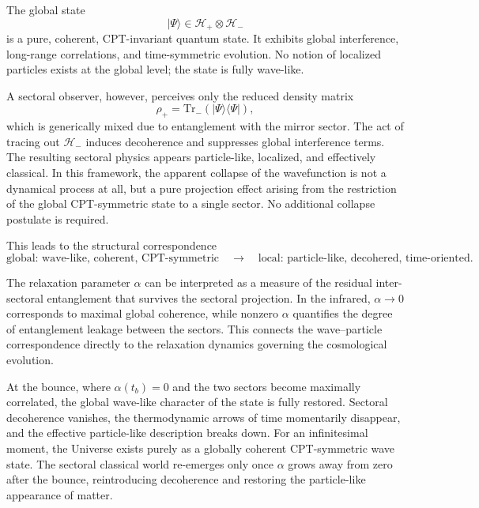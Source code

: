 \documentclass[11pt,a4paper]{article}
\begin{document}
The global state
\begin{equation}
    |\Psi\rangle \in \mathcal{H}_+ \otimes \mathcal{H}_-
\end{equation}
is a pure, coherent, CPT-invariant quantum state. It exhibits global interference, long-range
correlations, and time-symmetric evolution. No notion of localized particles exists at the global
level; the state is fully wave-like.

A sectoral observer, however, perceives only the reduced density matrix
\begin{equation}
    \rho_+ = \mathrm{Tr}_{-}\!\left(|\Psi\rangle\langle\Psi|\right),
\end{equation}
which is generically mixed due to entanglement with the mirror sector. The act of tracing out
$\mathcal{H}_-$ induces decoherence and suppresses global interference terms. The resulting
sectoral physics appears particle-like, localized, and effectively classical. In this framework, the
apparent collapse of the wavefunction is not a dynamical process at all, but a pure projection
effect arising from the restriction of the global CPT-symmetric state to a single sector. No
additional collapse postulate is required.

This leads to the structural correspondence
\begin{equation}
    \text{global: wave-like, coherent, CPT-symmetric}
    \quad\longrightarrow\quad
    \text{local: particle-like, decohered, time-oriented}.
\end{equation}

The relaxation parameter $\alpha$ can be interpreted as a measure of the residual inter-sectoral
entanglement that survives the sectoral projection. In the infrared, $\alpha \to 0$ corresponds to
maximal global coherence, while nonzero $\alpha$ quantifies the degree of entanglement leakage
between the sectors. This connects the wave–particle correspondence directly to the relaxation
dynamics governing the cosmological evolution.

At the bounce, where $\alpha(t_b) = 0$ and the two sectors become maximally correlated, the
global wave-like character of the state is fully restored. Sectoral decoherence vanishes, the
thermodynamic arrows of time momentarily disappear, and the effective particle-like description
breaks down. For an infinitesimal moment, the Universe exists purely as a globally coherent
CPT-symmetric wave state. The sectoral classical world re-emerges only once $\alpha$ grows away
from zero after the bounce, reintroducing decoherence and restoring the particle-like appearance
of matter.
\end{document}
